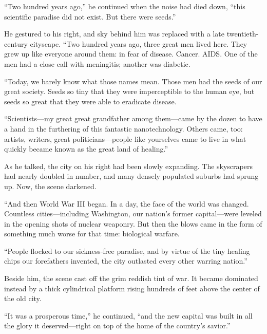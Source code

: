 \documentclass[12pt,letterpaper,oneside,english]{book}
\begin{document}
``Two hundred years ago,'' he continued when the noise had died down,
``this scientific paradise did not exist. But there were seeds.''

He gestured to his right, and sky behind him was replaced with a
late twentieth-century cityscape. ``Two hundred years ago, three great
men lived here. They grew up like everyone around them: in fear of
disease. Cancer. AIDS. One of the men had a close call with meningitis;
another was diabetic.

``Today, we barely know what those names mean. Those men had the seeds
of our great society. Seeds so tiny that they were imperceptible to the
human eye, but seeds so great that they were able to eradicate disease.

``Scientists---my great great grandfather among them---came by the dozen
to have a hand in the furthering of this fantastic nanotechnology.
Others came, too: artists, writers, great politicians---people like
yourselves came to live in what quickly became known as the great land
of healing.''

As he talked, the city on his right had been slowly expanding. The
skyscrapers had nearly doubled in number, and many densely populated
suburbs had sprung up. Now, the scene darkened.

``And then World War III began. In a day, the face of the world was
changed. Countless cities---including Washington, our nation's former
capital---were leveled in the opening shots of nuclear weaponry. But
then the blows came in the form of something much worse for that time:
biological warfare.

``People flocked to our sickness-free paradise, and by virtue of the
tiny healing chips our forefathers invented, the city outlasted every
other warring nation.''

Beside him, the scene cast off the grim reddish tint of war. It became
dominated instead by a thick cylindrical platform rising hundreds of
feet above the center of the old city.

``It was a prosperous time,'' he continued, ``and the new capital
was built in all the glory it deserved---right on top of the home of
the country's savior.''
\end{document}
